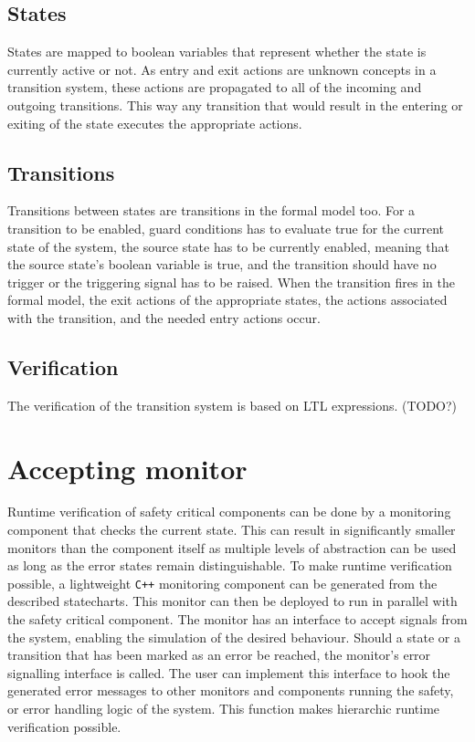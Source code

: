 \documentclass{book}
\begin{document}
{  \subsection{States}
States are mapped to boolean variables that represent whether the state is currently active or not. As entry and exit actions are unknown concepts in a transition system, these actions are propagated to all of the incoming and outgoing transitions. This way any transition that would result in the entering or exiting of the state executes the appropriate actions.
  \subsection{Transitions}
Transitions between states are transitions in the formal model too. For a transition to be enabled, guard conditions has to evaluate true for the current state of the system, the source state has to be currently enabled, meaning that the source state's boolean variable is true, and the transition should have no trigger or the triggering signal has to be raised. When the transition fires in the formal model, the exit actions of the appropriate states, the actions associated with the transition, and the needed entry actions occur.
  \subsection{Verification}
The verification of the transition system is based on LTL expressions. (TODO?)
\section{Accepting monitor}
Runtime verification of safety critical components can be done by a monitoring component that checks the current state. This can result in significantly smaller monitors than the component itself as multiple levels of abstraction can be used as long as the error states remain distinguishable. To make runtime verification possible, a lightweight \verb!C++! monitoring component can be generated from the described statecharts. This monitor can then be deployed to run in parallel with the safety critical component. The monitor has an interface to accept signals from the system, enabling the simulation of the desired behaviour. Should a state or a transition that has been marked as an error be reached, the monitor's error signalling interface is called. The user can implement this interface to hook the generated error messages to other monitors and components running the safety, or error handling logic of the system. This function makes hierarchic runtime verification possible.
}
\end{document}
